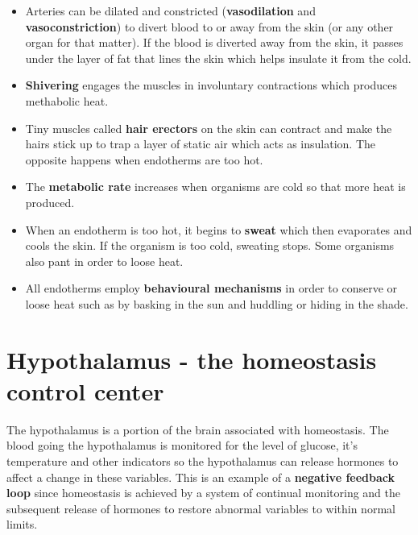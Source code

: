 \documentclass{article}
\begin{document}
\begin{itemize}

	\item Arteries can be dilated and constricted ({\bf vasodilation} and {\bf
	vasoconstriction}) to divert blood to or away from the skin (or any other
	organ for that matter). If the blood is diverted away from the skin, it
	passes under the layer of fat that lines the skin which helps insulate it
	from the cold.

	\item{\bf Shivering} engages the muscles in involuntary contractions which
	produces methabolic heat.

	\item Tiny muscles called {\bf hair erectors} on the skin can contract and
	make the hairs stick up to trap a layer of static air which acts as
	insulation. The opposite happens when endotherms are too hot.

	\item The {\bf metabolic rate} increases when organisms are cold so that
	more heat is produced.

	\item When an endotherm is too hot, it begins to {\bf sweat} which then
	evaporates and cools the skin. If the organism is too cold, sweating stops.
	Some organisms also pant in order to loose heat.

	\item All endotherms employ {\bf behavioural mechanisms} in order to
	conserve or loose heat such as by basking in the sun and huddling or hiding
	in the shade.

\end{itemize}

\section*{Hypothalamus - the homeostasis control center}

The hypothalamus is a portion of the brain associated with homeostasis. The
blood going the hypothalamus is monitored for the level of glucose, it's
temperature and other indicators so the hypothalamus can release hormones to
affect a change in these variables. This is an example of a {\bf negative
feedback loop} since homeostasis is achieved by a system of continual monitoring
and the subsequent release of hormones to restore abnormal variables to within
normal limits.

\end{document}
